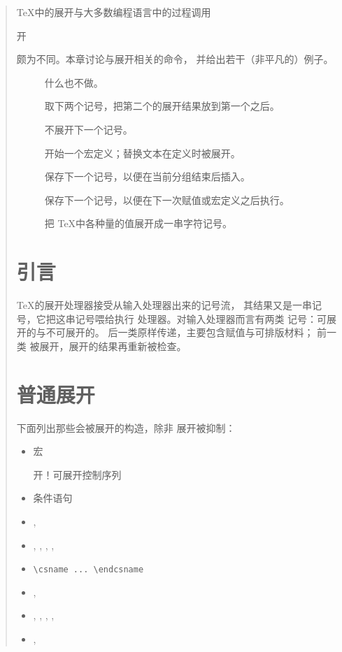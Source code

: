 \documentclass[a4paper]{rapport3}
\newenvironment{disp}{\begin{quotation}}{\end{quotation}}
\newenvironment{inventory}{\begin{description}}{\end{description}}
\def\term#1\par{\index{#1}}
\begin{document}
\begin{disp}
\TeX 中的展开与大多数编程语言中的过程调用
\term 展开\par
颇为不同。本章讨论与展开相关的命令，
并给出若干（非平凡的）例子。

\begin{inventory}
\item [] 
     什么也不做。


\item []  
      取下两个记号，把第二个的展开结果放到第一个之后。

\item []   
      不展开下一个记号。


\item [] 
      开始一个宏定义；替换文本在定义时被展开。

 
\item []  
      保存下一个记号，以便在当前分组结束后插入。

\item []   
      保存下一个记号，以便在下一次赋值或宏定义之后执行。


\item [] 
      把 \TeX 中各种量的值展开成一串字符记号。

\end{inventory}


\section{引言}

\TeX 的展开处理器接受从输入处理器出来的记号流，
其结果又是一串记号，它把这串记号喂给执行
处理器。对输入处理器而言有两类
记号：可展开的与不可展开的。
后一类原样传递，主要包含赋值与可排版材料；
前一类
被展开，展开的结果再重新被检查。

\section{普通展开}

下面列出那些会被展开的构造，除非
展开被抑制：
\begin{itemize}
\item 宏\label{expand:lijst}
\term 展开！可展开控制序列\par
\item 条件语句
\item {}, 
\item {}, , , 
      , 
\item \verb,\csname ... \endcsname,
\item {}, 
\item {}, , , 
      , 
\item {}, 
\end{itemize}


\end{disp}
\end{document}
